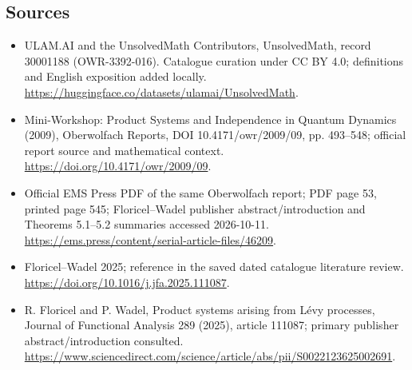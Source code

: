 \documentclass[11pt]{article}
\begin{document}
\subsection{Sources}
\begin{itemize}
\item[\hypertarget{source:30001188:1}{S1}] ULAM.AI and the UnsolvedMath Contributors, UnsolvedMath, record 30001188 (OWR-3392-016). Catalogue curation under CC BY 4.0; definitions and English exposition added locally.
\url{https://huggingface.co/datasets/ulamai/UnsolvedMath}.
\item[\hypertarget{source:30001188:2}{S2}] Mini-Workshop: Product Systems and Independence in Quantum Dynamics (2009), Oberwolfach Reports, DOI 10.4171/owr/2009/09, pp. 493--548; official report source and mathematical context.
\url{https://doi.org/10.4171/owr/2009/09}.
\item[\hypertarget{source:30001188:3}{S3}] Official EMS Press PDF of the same Oberwolfach report; PDF page 53, printed page 545; Floricel--Wadel publisher abstract/introduction and Theorems 5.1--5.2 summaries accessed 2026-10-11.
\url{https://ems.press/content/serial-article-files/46209}.
\item[\hypertarget{source:30001188:4}{S4}] Floricel--Wadel 2025; reference in the saved dated catalogue literature review.
\url{https://doi.org/10.1016/j.jfa.2025.111087}.
\item[\hypertarget{source:30001188:5}{S5}] R. Floricel and P. Wadel, Product systems arising from Lévy processes, Journal of Functional Analysis 289 (2025), article 111087; primary publisher abstract/introduction consulted.
\url{https://www.sciencedirect.com/science/article/abs/pii/S0022123625002691}.
\end{itemize}
\label{end:30001188}
\end{document}
